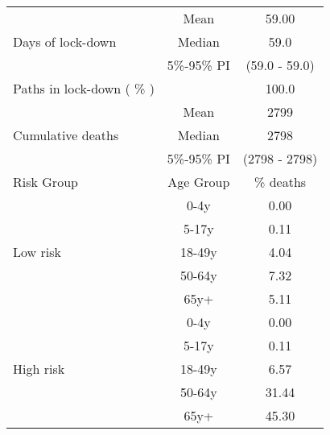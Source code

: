 \documentclass{article}
\begin{document}
\begin{table}[th]
\centering
\begin{tabular}{p{4cm}cc}
\toprule
\multirow{3}{*}{Days   of lock-down} & Mean      & 59.00                        \\ \cmidrule(l){2-3} 
                                     & Median    & 59.0                      \\ \cmidrule(l){2-3} 
                                     & 5\%-95\% PI & (59.0 - 59.0)       \\ \midrule 
\multirow{1}{*}{Paths in lock-down ( \% )} &      &         100.0              \\   \midrule                     
\multirow{3}{\hsize}{Cumulative deaths}       & Mean      & 2799 \\ \cmidrule(l){2-3} 
                                     & Median    & 2798                        \\ \cmidrule(l){2-3} 
                                     & 5\%-95\% PI & (2798 - 2798)           \\  \midrule
Risk Group                           & Age Group & \multicolumn{1}{c}{\% deaths}        \\  \midrule
\multirow{5}{*}{Low   risk}          & 0-4y      & 0.00                         \\ \cmidrule(l){2-3} 
                                     & 5-17y     & 0.11                         \\ \cmidrule(l){2-3} 
                                     & 18-49y    & 4.04                         \\ \cmidrule(l){2-3} 
                                     & 50-64y    & 7.32                         \\ \cmidrule(l){2-3} 
                                     & 65y+      & 5.11                         \\ \midrule
\multirow{5}{*}{High   risk}         & 0-4y      & 0.00                         \\ \cmidrule(l){2-3} 
                                     & 5-17y     & 0.11                         \\ \cmidrule(l){2-3} 
                                     & 18-49y    & 6.57                         \\ \cmidrule(l){2-3} 
                                     & 50-64y    & 31.44                         \\ \cmidrule(l){2-3} 
                                     & 65y+      & 45.30                         \\ \midrule

\end{tabular}
\end{table}
\end{document}
